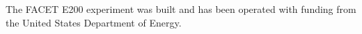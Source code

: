 \begin{acknowledgments}
The FACET E200 experiment was built and has been operated with funding
from the United States Department of Energy.
\end{acknowledgments}
